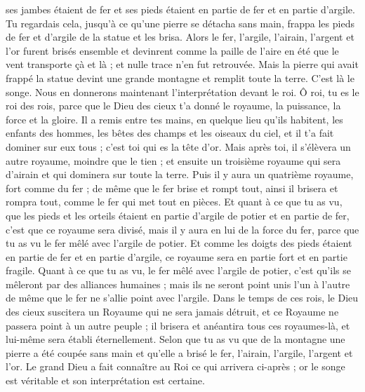 \begin{multicols}{2}
ses jambes étaient de fer et ses pieds étaient en partie de fer et en partie d'argile.
Tu regardais cela, jusqu'à ce qu'une pierre se détacha sans main, frappa les pieds de fer et d'argile de la statue et les brisa.
Alors le fer, l'argile, l'airain, l'argent et l'or furent brisés ensemble et devinrent comme la paille de l'aire en été que le vent transporte çà et là ; et nulle trace n'en fut retrouvée. Mais la pierre qui avait frappé la statue devint une grande montagne et remplit toute la terre.
C'est là le songe. Nous en donnerons maintenant l'interprétation devant le roi.
Ô roi, tu es le roi des rois, parce que le Dieu des cieux t'a donné le royaume, la puissance, la force et la gloire.
Il a remis entre tes mains, en quelque lieu qu'ils habitent, les enfants des hommes, les bêtes des champs et les oiseaux du ciel, et il t'a fait dominer sur eux tous ; c'est toi qui es la tête d'or.
Mais après toi, il s'élèvera un autre royaume, moindre que le tien ; et ensuite un troisième royaume qui sera d'airain et qui dominera sur toute la terre.
Puis il y aura un quatrième royaume, fort comme du fer ; de même que le fer brise et rompt tout, ainsi il brisera et rompra tout, comme le fer qui met tout en pièces.
Et quant à ce que tu as vu, que les pieds et les orteils étaient en partie d'argile de potier et en partie de fer, c'est que ce royaume sera divisé, mais il y aura en lui de la force du fer, parce que tu as vu le fer mêlé avec l'argile de potier.
Et comme les doigts des pieds étaient en partie de fer et en partie d'argile, ce royaume sera en partie fort et en partie fragile.
 Quant à ce que tu as vu, le fer mêlé avec l'argile de potier, c'est qu'ils se mêleront par des alliances humaines ; mais ils ne seront point unis l'un à l'autre de même que le fer ne s'allie point avec l'argile.
Dans le temps de ces rois, le Dieu des cieux suscitera un Royaume qui ne sera jamais détruit, et ce Royaume ne passera point à un autre peuple ; il brisera et anéantira tous ces royaumes-là, et lui-même sera établi éternellement.
Selon que tu as vu que de la montagne une pierre a été coupée sans main et qu'elle a brisé le fer, l'airain, l'argile, l'argent et l'or. Le grand Dieu a fait connaître au Roi ce qui arrivera ci-après ; or le songe est véritable et son interprétation est certaine.

\end{multicols}
